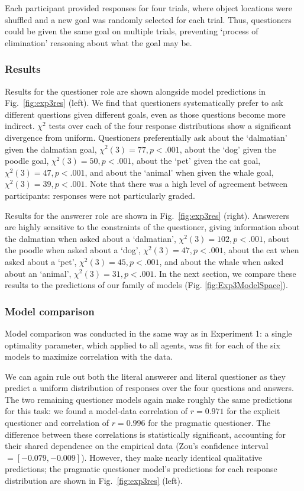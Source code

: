 \documentclass[12pt, floatsintext, jou]{apa6}
\begin{document}
Each participant provided responses for four trials, where object locations were shuffled and a new goal was randomly selected for each trial. Thus, questioners could be given the same goal on multiple trials, preventing `process of elimination' reasoning about what the goal may be.

\subsubsection{Results}
Results for the questioner role are shown alongside model predictions in Fig.~\ref{fig:exp3res} (left). We find that questioners systematically prefer to ask different questions given different goals, even as those questions become more indirect. $\chi^2$ tests over each of the four response distributions show a significant divergence from uniform. Questioners preferentially ask about the `dalmatian' given the  dalmatian goal, ${\chi^2(3) = 77}, {p < .001}$, about the `dog' given the poodle goal, ${\chi^2(3) = 50}, {p <.001}$, about the `pet' given the cat goal, ${\chi^2(3) = 47},  {p <.001}$, and about the `animal' when given the whale goal, ${\chi^2(3) = 39}, {p <.001}$. Note that there was a high level of agreement between participants: responses were not particularly graded.

Results for the answerer role are shown in Fig.~\ref{fig:exp3res} (right). Answerers are highly sensitive to the constraints of the questioner, giving information about the dalmatian when asked about a `dalmatian', ${\chi^2(3) = 102}, {p <.001}$, about the poodle when asked about a `dog', ${\chi^2(3) = 47}, {p <.001}$, about the cat when asked about a `pet', ${\chi^2(3) = 45}, {p<.001}$, and about the whale when asked about an `animal', ${\chi^2(3) = 31}, {p < .001}$. In the next section, we compare these results to the predictions of our family of models (Fig. \ref{fig:Exp3ModelSpace}). 

\subsubsection{Model comparison}

Model comparison was conducted in the same way as in Experiment 1: a single optimality parameter, which applied to all agents, was fit for each of the six models to maximize correlation with the data.

We can again rule out both the literal answerer and literal questioner as they predict a uniform distribution of responses over the four questions and answers. The two remaining questioner models again make roughly the same predictions for this task:
we found a model-data correlation of $r = 0.971$ for the explicit questioner and correlation of $r = 0.996$ for the pragmatic questioner. The difference between these correlations is statistically significant, accounting for their shared dependence on the empirical data (Zou's confidence interval $= [-0.079, -0.009]$). However, they make nearly identical qualitative predictions; the pragmatic questioner model's predictions for each response distribution are shown in Fig.~\ref{fig:exp3res} (left). 
\end{document}
